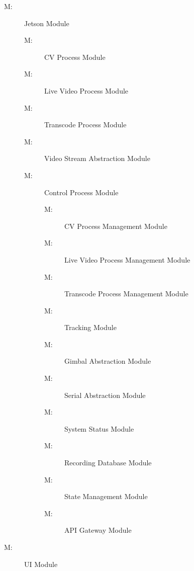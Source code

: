 \documentclass[12pt, titlepage]{article}
\newcounter{mnum}
\newcommand{\mthemnum}{M\themnum}
\begin{document}
\begin{description}
  \item [ \mthemnum \label{mJetson}:] Jetson Module
        \begin{description}
          \item [ \mthemnum \label{mCV}:] CV Process Module
          \item [ \mthemnum \label{mVideo}:] Live Video Process Module
          \item [ \mthemnum \label{mTranscode}:] Transcode Process Module
          \item [ \mthemnum \label{mStream}:] Video Stream Abstraction Module
          \item [ \mthemnum \label{mControl}:] Control Process Module
                \begin{description}
                  \item [ \mthemnum \label{mCVManagement}:] CV Process Management Module
                  \item [ \mthemnum \label{mVideoManagement}:] Live Video Process Management Module
                  \item [ \mthemnum \label{mTranscodeManagement}:] Transcode Process Management Module
                  \item [ \mthemnum \label{mTrack}:] Tracking Module
                  \item [ \mthemnum \label{mGimbal}:] Gimbal Abstraction Module
                  \item [ \mthemnum \label{mSerial}:] Serial Abstraction Module
                  \item [ \mthemnum \label{mStatus}:] System Status Module
                  \item [ \mthemnum \label{mRecord}:] Recording Database Module
                  \item [ \mthemnum \label{mState}:] State Management Module
                  \item [ \mthemnum \label{mAPI}:] API Gateway Module
                \end{description}
        \end{description}
  \item [ \mthemnum \label{mUI}:] UI Module

\end{description}
\end{document}
